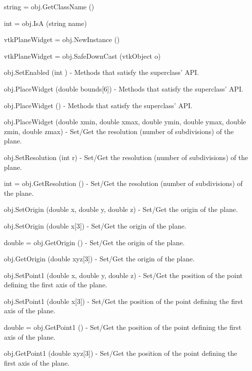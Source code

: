 \begin{DoxyItemize}
\item {\ttfamily string = obj.\-Get\-Class\-Name ()}  
\item {\ttfamily int = obj.\-Is\-A (string name)}  
\item {\ttfamily vtk\-Plane\-Widget = obj.\-New\-Instance ()}  
\item {\ttfamily vtk\-Plane\-Widget = obj.\-Safe\-Down\-Cast (vtk\-Object o)}  
\item {\ttfamily obj.\-Set\-Enabled (int )} -\/ Methods that satisfy the superclass' A\-P\-I.  
\item {\ttfamily obj.\-Place\-Widget (double bounds\mbox{[}6\mbox{]})} -\/ Methods that satisfy the superclass' A\-P\-I.  
\item {\ttfamily obj.\-Place\-Widget ()} -\/ Methods that satisfy the superclass' A\-P\-I.  
\item {\ttfamily obj.\-Place\-Widget (double xmin, double xmax, double ymin, double ymax, double zmin, double zmax)} -\/ Set/\-Get the resolution (number of subdivisions) of the plane.  
\item {\ttfamily obj.\-Set\-Resolution (int r)} -\/ Set/\-Get the resolution (number of subdivisions) of the plane.  
\item {\ttfamily int = obj.\-Get\-Resolution ()} -\/ Set/\-Get the resolution (number of subdivisions) of the plane.  
\item {\ttfamily obj.\-Set\-Origin (double x, double y, double z)} -\/ Set/\-Get the origin of the plane.  
\item {\ttfamily obj.\-Set\-Origin (double x\mbox{[}3\mbox{]})} -\/ Set/\-Get the origin of the plane.  
\item {\ttfamily double = obj.\-Get\-Origin ()} -\/ Set/\-Get the origin of the plane.  
\item {\ttfamily obj.\-Get\-Origin (double xyz\mbox{[}3\mbox{]})} -\/ Set/\-Get the origin of the plane.  
\item {\ttfamily obj.\-Set\-Point1 (double x, double y, double z)} -\/ Set/\-Get the position of the point defining the first axis of the plane.  
\item {\ttfamily obj.\-Set\-Point1 (double x\mbox{[}3\mbox{]})} -\/ Set/\-Get the position of the point defining the first axis of the plane.  
\item {\ttfamily double = obj.\-Get\-Point1 ()} -\/ Set/\-Get the position of the point defining the first axis of the plane.  
\item {\ttfamily obj.\-Get\-Point1 (double xyz\mbox{[}3\mbox{]})} -\/ Set/\-Get the position of the point defining the first axis of the plane.  

\end{DoxyItemize}
